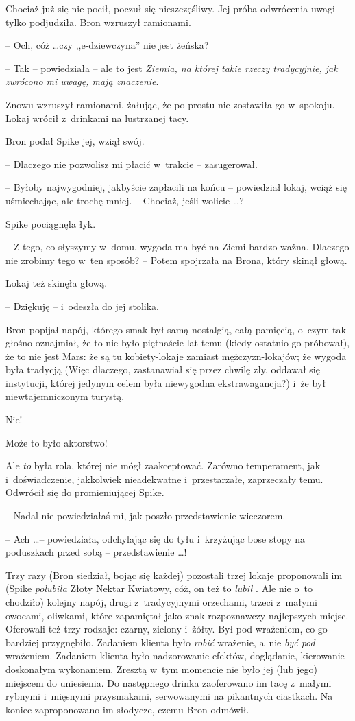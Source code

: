 \documentclass[oneside,polish,11pt,rmheadings]{mwbk}
\begin{document}
Chociaż już się nie pocił, poczuł się nieszczęśliwy. Jej próba odwrócenia uwagi tylko podjudziła. Bron wzruszył ramionami. 

-- Och, cóż \ldots  czy ,,e-dziewczyna'' nie jest żeńska? 

-- Tak -- powiedziała -- ale to jest \textit{Ziemia, na której takie rzeczy tradycyjnie, jak zwrócono mi uwagę, mają znaczenie}. 

Znowu wzruszył ramionami, żałując, że po prostu nie zostawiła go w~spokoju. Lokaj wrócił z~drinkami na lustrzanej tacy. 

Bron podał Spike jej, wziął swój. 

-- Dlaczego nie pozwolisz mi płacić w~trakcie -- zasugerował. 

-- Byłoby najwygodniej, jakbyście zapłacili na końcu -- powiedział lokaj, wciąż się uśmiechając, ale trochę mniej. -- Chociaż, jeśli wolicie \ldots ? 

Spike pociągnęła łyk. 

-- Z tego, co słyszymy w~domu, wygoda ma być na Ziemi bardzo ważna. Dlaczego nie zrobimy tego w~ten sposób? -- Potem spojrzała na Brona, który skinął głową. 

Lokaj też skinęła głową. 

-- Dziękuję -- i~odeszła do jej stolika. 

Bron popijał napój, którego smak był samą nostalgią, całą pamięcią, o~czym tak głośno oznajmiał, że to nie było piętnaście lat temu (kiedy ostatnio go próbował), że to nie jest Mars: że są tu kobiety-lokaje zamiast mężczyzn-lokajów; że wygoda była tradycją (Więc dlaczego, zastanawiał się przez chwilę zły, oddawał się instytucji, której jedynym celem była niewygodna ekstrawagancja?) i~że był niewtajemniczonym turystą. 

Nie! 

Może to było aktorstwo! 

Ale \textit{to }była rola, której nie mógł zaakceptować. Zarówno temperament, jak i~doświadczenie, jakkolwiek nieadekwatne i~przestarzałe, zaprzeczały temu. Odwrócił się do promieniującej Spike. 

-- Nadal nie powiedziałaś mi, jak poszło przedstawienie wieczorem. 

-- Ach \ldots  -- powiedziała, odchylając się do tyłu i~krzyżując bose stopy na poduszkach przed sobą -- przedstawienie \ldots ! 

Trzy razy (Bron siedział, bojąc się każdej) pozostali trzej lokaje proponowali im (Spike \textit{polubiła }Złoty Nektar Kwiatowy, cóż, on też to \textit{lubił }. Ale nie o~to chodziło) kolejny napój, drugi z~tradycyjnymi orzechami, trzeci z~małymi owocami, oliwkami, które zapamiętał jako znak rozpoznawczy najlepszych miejsc. Oferowali też trzy rodzaje: czarny, zielony i~żółty. Był pod wrażeniem, co go bardziej przygnębiło. Zadaniem klienta było \textit{robić }wrażenie, a~nie \textit{być pod }wrażeniem. Zadaniem klienta było nadzorowanie efektów, doglądanie, kierowanie doskonałym wykonaniem. Zresztą w~tym momencie nie było jej (lub jego) miejscem do uniesienia. Do następnego drinka zaoferowano im tacę z~małymi rybnymi i~mięsnymi przysmakami, serwowanymi na pikantnych ciastkach. Na koniec zaproponowano im słodycze, czemu Bron odmówił. 
\end{document}
